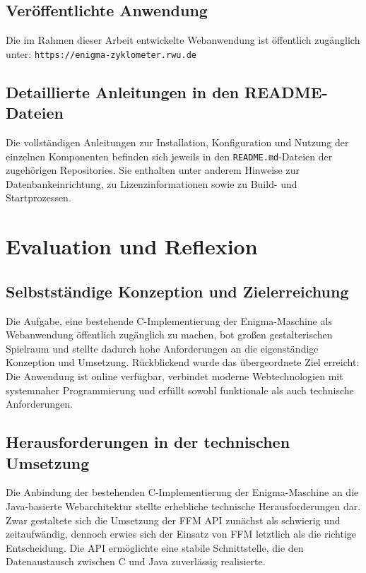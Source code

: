 \documentclass[12pt, ngerman, a4paper, numbers=noenddot]{article}
\begin{document}
\subsection{Veröffentlichte Anwendung}

Die im Rahmen dieser Arbeit entwickelte Webanwendung ist öffentlich zugänglich unter:  
\lstinline|https://enigma-zyklometer.rwu.de|

\subsection{Detaillierte Anleitungen in den README-Dateien}

Die vollständigen Anleitungen zur Installation, Konfiguration und Nutzung der einzelnen Komponenten befinden sich jeweils in den \lstinline|README.md|-Dateien der zugehörigen Repositories.  
Sie enthalten unter anderem Hinweise zur Datenbankeinrichtung, zu Lizenzinformationen sowie zu Build- und Startprozessen.  





\newpage
\section{Evaluation und Reflexion}

\subsection{Selbstständige Konzeption und Zielerreichung}

Die Aufgabe, eine bestehende C-Implementierung der Enigma-Maschine als Webanwendung öffentlich zugänglich zu machen, bot großen gestalterischen Spielraum und stellte dadurch hohe Anforderungen an die eigenständige Konzeption und Umsetzung. Rückblickend wurde das übergeordnete Ziel erreicht: Die Anwendung ist online verfügbar, verbindet moderne Webtechnologien mit systemnaher Programmierung und erfüllt sowohl funktionale als auch technische Anforderungen.

\subsection{Herausforderungen in der technischen Umsetzung}

Die Anbindung der bestehenden C-Implementierung der Enigma-Maschine an die Java-basierte Webarchitektur stellte erhebliche technische Herausforderungen dar. Zwar gestaltete sich die Umsetzung der FFM API zunächst als schwierig und zeitaufwändig, dennoch erwies sich der Einsatz von FFM letztlich als die richtige Entscheidung. Die API ermöglichte eine stabile Schnittstelle, die den Datenaustausch zwischen C und Java zuverlässig realisierte.
\end{document}
